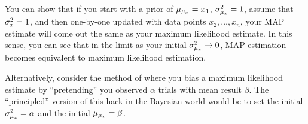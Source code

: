 You can show that if you start with a prior of $\mu_{\mu_x} = x_1$, $\sigma^2_{\mu_x}
= 1$, assume that $\sigma^2_x = 1$, and then one-by-one updated with data
points $x_2, \ldots, x_n$, your MAP estimate will come out the same as
your maximum likelihood estimate. In this sense, you can see that in the
limit as your initial $\sigma^2_{\mu_x} \to 0$, MAP estimation becomes equivalent
to maximum likelihood estimation.

Alternatively, consider the method of  where you
bias a maximum likelihood estimate by ``pretending'' you observed
$\alpha$ trials with mean result $\beta$. The ``principled'' version of
this hack in the Bayesian world would be to set the initial $\sigma^2_{\mu_x} =
\alpha$ and the initial $\mu_{\mu_x} = \beta$.
